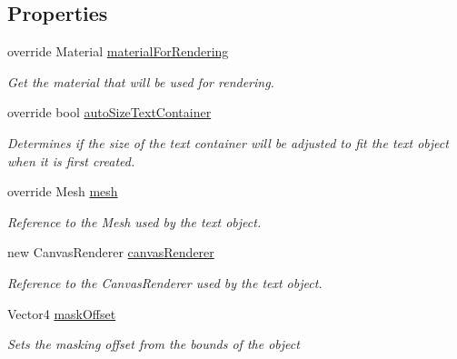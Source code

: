 \subsection*{Properties}
\begin{DoxyCompactItemize}
\item 
override Material \mbox{\hyperlink{class_t_m_pro_1_1_text_mesh_pro_u_g_u_i_ace5f88e44a4fd41741e50b0b9adb2944}{material\+For\+Rendering}}
\begin{DoxyCompactList}\small\item\em Get the material that will be used for rendering. \end{DoxyCompactList}\item 
override bool \mbox{\hyperlink{class_t_m_pro_1_1_text_mesh_pro_u_g_u_i_a72ed4179b22cde1a87b5c6282d6dfd4c}{auto\+Size\+Text\+Container}}
\begin{DoxyCompactList}\small\item\em Determines if the size of the text container will be adjusted to fit the text object when it is first created. \end{DoxyCompactList}\item 
override Mesh \mbox{\hyperlink{class_t_m_pro_1_1_text_mesh_pro_u_g_u_i_a0c6c3fd5daff551039308552d0e9fa3c}{mesh}}
\begin{DoxyCompactList}\small\item\em Reference to the Mesh used by the text object. \end{DoxyCompactList}\item 
new Canvas\+Renderer \mbox{\hyperlink{class_t_m_pro_1_1_text_mesh_pro_u_g_u_i_a8410ad5e8c69c64d5e1df5a722390526}{canvas\+Renderer}}
\begin{DoxyCompactList}\small\item\em Reference to the Canvas\+Renderer used by the text object. \end{DoxyCompactList}\item 
Vector4 \mbox{\hyperlink{class_t_m_pro_1_1_text_mesh_pro_u_g_u_i_aa3493316f1488b2f92d0f7edb56b1c56}{mask\+Offset}}
\begin{DoxyCompactList}\small\item\em Sets the masking offset from the bounds of the object \end{DoxyCompactList}\end{DoxyCompactItemize}
